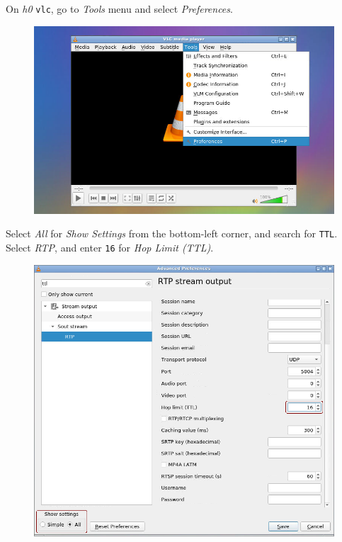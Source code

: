 \documentclass{../UTNetLab}
\begin{document}
    On \textit{h0} \lstinline{vlc}, go to \textit{Tools} menu and select \textit{Preferences}.
    \begin{figure}[H]
        \centering
        \includegraphics[scale=2]{img/open-pref}
    \end{figure}
    Select \textit{All} for \textit{Show Settings} from the bottom-left corner,
    and search for \texttt{TTL}.
    Select \textit{RTP},
    and enter \texttt{16} for \textit{Hop Limit (TTL)}.
    \begin{figure}[H]
        \centering
        \includegraphics[scale=2.2]{img/pref}
    \end{figure}
\end{document}
